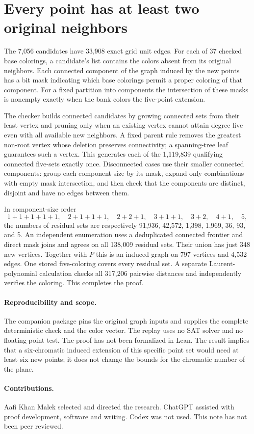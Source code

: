 \documentclass[11pt,letterpaper]{article}
\begin{document}
\section{Every point has at least two original neighbors}
The 7,056 candidates have 33,908 exact grid unit edges. For each
of 37 checked base colorings, a candidate's list contains the
colors absent from its original neighbors. Each connected
component of the graph induced by the new points has a bit
mask indicating which base colorings permit a proper coloring
of that component. For a fixed partition into components the
intersection of these masks is nonempty exactly when the bank
colors the five-point extension.

The checker builds connected candidates by growing connected
sets from their least vertex and pruning only when an existing
vertex cannot attain degree five even with all available new
neighbors. A fixed parent rule removes the greatest non-root
vertex whose deletion preserves connectivity; a spanning-tree
leaf guarantees such a vertex. This generates each of the
1,119,839 qualifying connected five-sets exactly once.
Disconnected cases use their smaller connected components:
group each component size by its mask, expand only combinations
with empty mask intersection, and then check that the components
are distinct, disjoint and have no edges between them.

In component-size order
\[
  1+1+1+1+1,\quad 2+1+1+1,\quad 2+2+1,\quad
  3+1+1,\quad 3+2,\quad 4+1,\quad 5,
\]
the numbers of residual sets are respectively
91,936, 42,572, 1,398, 1,969, 36, 93, and 5.
An independent enumeration uses a deduplicated connected
frontier and direct mask joins and agrees on all 138,009
residual sets. Their union has just 348 new vertices.
Together with \(P\) this is an induced graph on 797 vertices
and 4,532 edges. One stored five-coloring covers every
residual set. A separate Laurent-polynomial calculation
checks all 317,206 pairwise distances and independently
verifies the coloring. This completes the proof.

\paragraph{Reproducibility and scope.}
The companion package pins the original graph inputs and
supplies the complete deterministic check and the color vector.
The replay uses no SAT solver and no floating-point test.
The proof has not been formalized in Lean. The result implies
that a six-chromatic induced extension of this specific
point set would need at least six new points; it does not
change the bounds for the chromatic number of the plane.

\paragraph{Contributions.}
Aafi Khan Malek selected and directed the research. ChatGPT
assisted with proof development, software and writing.
Codex was not used. This note has not been peer reviewed.
\end{document}
